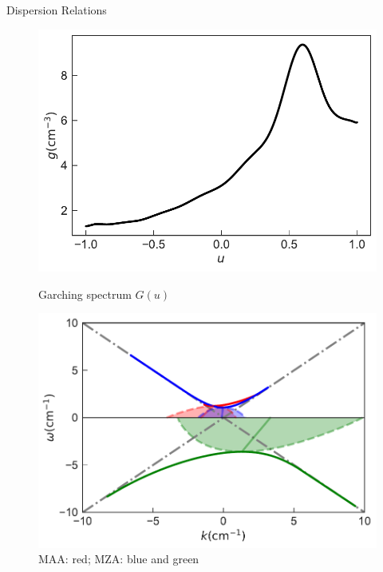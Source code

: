 \documentclass[9pt]{beamer}
\begin{document}
\begin{darkframes}
\begin{frame}{Dispersion Relations}
   \begin{figure}
        \includegraphics[width=\linewidth]{assets/dr/spectGarchingPlt.pdf}
        \caption*{Garching spectrum $G(u)$}
      \endminipage\hfill
      \includegraphics[width=\linewidth]{assets/dr/spectGarchingDRLSAPltBlob.pdf}
      \caption*{ MAA: red; MZA: blue and green }
      \endminipage\hfill
   \end{figure}



\end{frame}
\end{darkframes}
\end{document}

